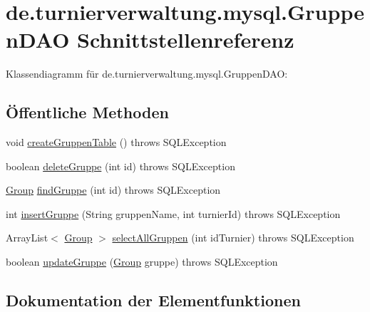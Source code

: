 \hypertarget{interfacede_1_1turnierverwaltung_1_1mysql_1_1_gruppen_d_a_o}{}\section{de.\+turnierverwaltung.\+mysql.\+Gruppen\+D\+AO Schnittstellenreferenz}
\label{interfacede_1_1turnierverwaltung_1_1mysql_1_1_gruppen_d_a_o}


Klassendiagramm für de.\+turnierverwaltung.\+mysql.\+Gruppen\+D\+AO\+:
\subsection*{Öffentliche Methoden}
\begin{DoxyCompactItemize}
\item 
void \hyperlink{interfacede_1_1turnierverwaltung_1_1mysql_1_1_gruppen_d_a_o_ad38ae6a7633e3164f8e4a9e3dcf5ce84}{create\+Gruppen\+Table} ()  throws S\+Q\+L\+Exception
\item 
boolean \hyperlink{interfacede_1_1turnierverwaltung_1_1mysql_1_1_gruppen_d_a_o_a8e8f3d0dc565692bb4c6c21e84127d7f}{delete\+Gruppe} (int id)  throws S\+Q\+L\+Exception
\item 
\hyperlink{classde_1_1turnierverwaltung_1_1model_1_1_group}{Group} \hyperlink{interfacede_1_1turnierverwaltung_1_1mysql_1_1_gruppen_d_a_o_af0efea2e11965a84378d57f1a94f68b3}{find\+Gruppe} (int id)  throws S\+Q\+L\+Exception
\item 
int \hyperlink{interfacede_1_1turnierverwaltung_1_1mysql_1_1_gruppen_d_a_o_abee6784dae9d4de7ac44fe54f66bb5e2}{insert\+Gruppe} (String gruppen\+Name, int turnier\+Id)  throws S\+Q\+L\+Exception
\item 
Array\+List$<$ \hyperlink{classde_1_1turnierverwaltung_1_1model_1_1_group}{Group} $>$ \hyperlink{interfacede_1_1turnierverwaltung_1_1mysql_1_1_gruppen_d_a_o_a76a40ff09a9620267c4c61d3d0efb64e}{select\+All\+Gruppen} (int id\+Turnier)  throws S\+Q\+L\+Exception
\item 
boolean \hyperlink{interfacede_1_1turnierverwaltung_1_1mysql_1_1_gruppen_d_a_o_a86be33fec86dded1380312ae33f236dd}{update\+Gruppe} (\hyperlink{classde_1_1turnierverwaltung_1_1model_1_1_group}{Group} gruppe)  throws S\+Q\+L\+Exception
\end{DoxyCompactItemize}


\subsection{Dokumentation der Elementfunktionen}
